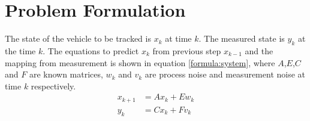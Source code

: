 \chapter{Problem Formulation} \label{ch:problem}
The state of the vehicle to be tracked is $x_k$ at time $k$. The measured state is $y_k$ at the time $k$. The equations to predict $x_k$ from previous step $x_{k-1}$ and the mapping from measurement is shown in equation \ref{formula:system}, where $A$,$E$,$C$ and $F$ are known matrices, $w_k$ and $v_k$ are process noise and measurement noise at time $k$ respectively. 
\begin{equation}
\label{formula:system}
\begin{split}
x_{k+1} &= Ax_k + Ew_k\\
y_k &= Cx_k + Fv_k
\end{split}
\end{equation}


